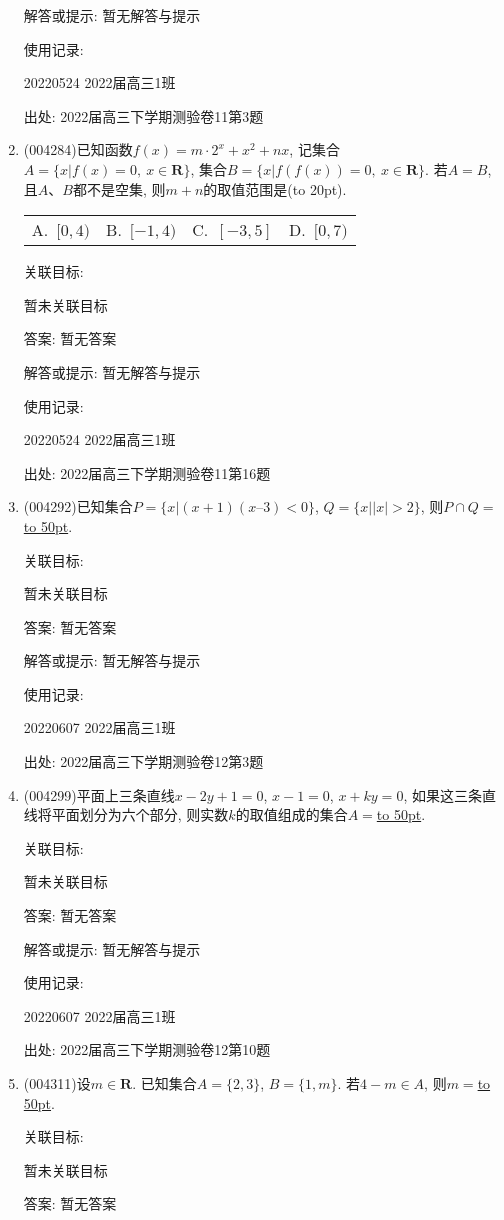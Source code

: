 \documentclass[10pt,a4paper]{article}
\newcommand{\blank}[1]{\underline{\hbox to #1pt{}}}
\newcommand{\bracket}[1]{(\hbox to #1pt{})}
\newcommand{\fourch}[4]{\par\begin{tabular}{p{.23\textwidth}p{.23\textwidth}p{.23\textwidth}p{.23\textwidth}}
A.~#1 &B.~#2& C.~#3& D.~#4
\end{tabular}}
\begin{document}
\begin{enumerate}[1.]
解答或提示: 暂无解答与提示

使用记录:

20220524	2022届高三1班	


出处: 2022届高三下学期测验卷11第3题
\item { (004284)}已知函数$f(x)=m\cdot 2^x+x^2+nx$, 记集合$A=\{x|f(x)=0, \ x\in \mathbf{R}\}$, 集合$B=\{x|f(f(x))=0, \ x\in \mathbf{R}\}$.
若$A=B$, 且$A$、$B$都不是空集, 则$m+n$的取值范围是\bracket{20}.
\fourch{$[0,4)$}{$[-1,4)$}{$[-3,5]$}{$[0,7)$}


关联目标:

暂未关联目标

答案: 暂无答案

解答或提示: 暂无解答与提示

使用记录:

20220524	2022届高三1班	


出处: 2022届高三下学期测验卷11第16题
\item { (004292)}已知集合$P=\{x|(x+1)(x–3)<0\}$, $Q=\{x||x|>2\}$, 则$P\cap Q=$\blank{50}.


关联目标:

暂未关联目标

答案: 暂无答案

解答或提示: 暂无解答与提示

使用记录:

20220607	2022届高三1班	


出处: 2022届高三下学期测验卷12第3题
\item { (004299)}平面上三条直线$x-2y+1=0$, $x-1=0$, $x+ky=0$, 如果这三条直线将平面划分为六个部分, 则实数$k$的取值组成的集合$A=$\blank{50}.


关联目标:

暂未关联目标

答案: 暂无答案

解答或提示: 暂无解答与提示

使用记录:

20220607	2022届高三1班	


出处: 2022届高三下学期测验卷12第10题
\item { (004311)}设$m\in \mathbf{R}$. 已知集合$A=\{2,3\}$, $B=\{1,m\}$. 若$4-m\in A$, 则$m=$\blank{50}.


关联目标:

暂未关联目标

答案: 暂无答案


\end{enumerate}
\end{document}

